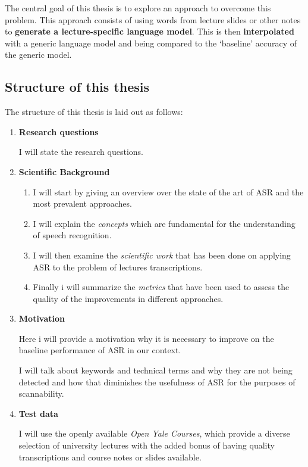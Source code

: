 The central goal of this thesis is to explore an approach to overcome
this problem. This approach consists of using words from lecture slides
or other notes to \textbf{generate a lecture-specific language model}.
This is then \textbf{interpolated} with a generic language model and
being compared to the `baseline' accuracy of the generic model.

\subsection*{Structure of this thesis}\label{structure-of-this-thesis}

The structure of this thesis is laid out as follows:

\begin{enumerate}
\def\labelenumi{(\arabic{enumi})}
\item
  \textbf{Research questions}

  I will state the research questions.
\item
  \textbf{Scientific Background}

  \begin{enumerate}
  \item
    I will start by giving an overview over the state of the art of ASR
    and the most prevalent approaches.
  \item
    I will explain the \emph{concepts} which are fundamental for the
    understanding of speech recognition.
  \item
    I will then examine the \emph{scientific work} that has been done on
    applying ASR to the problem of lectures transcriptions.
  \item
    Finally i will summarize the \emph{metrics} that have been used to
    assess the quality of the improvements in different approaches.
  \end{enumerate}
\item
  \textbf{Motivation}

  Here i will provide a motivation why it is necessary to improve on the
  baseline performance of ASR in our context.

  I will talk about keywords and technical terms and why they are not
  being detected and how that diminishes the usefulness of ASR for the
  purposes of scannability.
\item
  \textbf{Test data}

  I will use the openly available \emph{Open Yale Courses}, which
  provide a diverse selection of university lectures with the added
  bonus of having quality transcriptions and course notes or slides
  available.


\end{enumerate}
